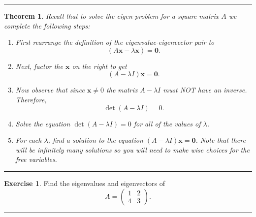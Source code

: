 \documentclass[
]{book}
\providecommand{\tightlist}{%
  \setlength{\itemsep}{0pt}\setlength{\parskip}{0pt}}
\newtheorem{theorem}{Theorem}[chapter]
\theoremstyle{definition}
\theoremstyle{definition}
\theoremstyle{definition}
\newtheorem{exercise}{Exercise}[chapter]
\theoremstyle{remark}
\begin{document}
\begin{center}\rule{0.5\linewidth}{0.5pt}\end{center}

\begin{theorem}
\protect\hypertarget{thm:unnamed-chunk-359}{}{\label{thm:unnamed-chunk-359} }Recall that to solve the eigen-problem for a square matrix \(A\) we complete the following steps:

\begin{enumerate}
\def\labelenumi{\alph{enumi}.}
\tightlist
\item
  First rearrange the definition of the eigenvalue-eigenvector pair to
  \[(A\boldsymbol{x}-\lambda \boldsymbol{x})=\boldsymbol{0}.\]
\item
  Next, factor the \(\boldsymbol{x}\) on the right to get
  \[(A-\lambda I) \boldsymbol{x}=\boldsymbol{0}.\]
\item
  Now observe that since \(\boldsymbol{x} \ne 0\) the matrix \(A-\lambda I\) must NOT have an inverse. Therefore, \[\det(A-\lambda I)=0.\]
\item
  Solve the equation \(\det(A-\lambda I)=0\) for all of the values of \(\lambda\).
\item
  For each \(\lambda\), find a solution to the equation
  \((A-\lambda I) \boldsymbol{x}=\boldsymbol{0}\). Note that there will be infinitely many solutions so you will need to make wise choices for the free variables.
\end{enumerate}
\end{theorem}

\begin{center}\rule{0.5\linewidth}{0.5pt}\end{center}

\begin{exercise}
\protect\hypertarget{exr:unnamed-chunk-360}{}{\label{exr:unnamed-chunk-360} }Find the eigenvalues and eigenvectors of
\[ A = \begin{pmatrix} 1 & 2 \\ 4 & 3 \end{pmatrix}. \]
\end{exercise}

\begin{center}\rule{0.5\linewidth}{0.5pt}\end{center}
\end{document}
